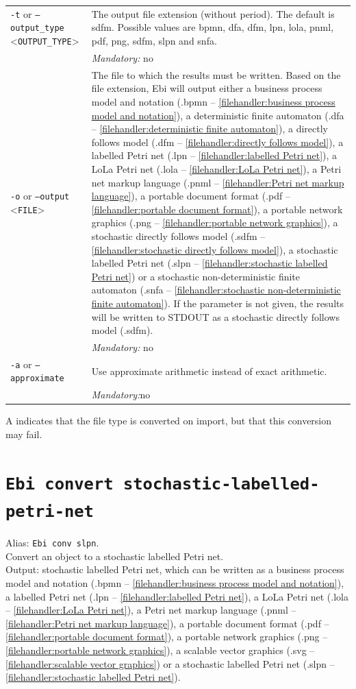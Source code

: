 {\begin{tabularx}{\linewidth}{lX}
\texttt{-t} or \texttt{--output\_type} <\texttt{OUTPUT\_TYPE}> &
The output file extension (without period). The default is sdfm. Possible values are bpmn, dfa, dfm, lpn, lola, pnml, pdf, png, sdfm, slpn and snfa.\\
&\textit{Mandatory:} \quad no\\
\texttt{-o} or \texttt{--output} <\texttt{FILE}> &
The file to which the results must be written. Based on the file extension, Ebi will output either a business process model and notation (.bpmn -- \cref{filehandler:business process model and notation}), a deterministic finite automaton (.dfa -- \cref{filehandler:deterministic finite automaton}), a directly follows model (.dfm -- \cref{filehandler:directly follows model}), a labelled Petri net (.lpn -- \cref{filehandler:labelled Petri net}), a LoLa Petri net (.lola -- \cref{filehandler:LoLa Petri net}), a Petri net markup language (.pnml -- \cref{filehandler:Petri net markup language}), a portable document format (.pdf -- \cref{filehandler:portable document format}), a portable network graphics (.png -- \cref{filehandler:portable network graphics}), a stochastic directly follows model (.sdfm -- \cref{filehandler:stochastic directly follows model}), a stochastic labelled Petri net (.slpn -- \cref{filehandler:stochastic labelled Petri net}) or a stochastic non-deterministic finite automaton (.snfa -- \cref{filehandler:stochastic non-deterministic finite automaton}).
If the parameter is not given, the results will be written to STDOUT as a stochastic directly follows model (.sdfm).\\
&\textit{Mandatory:} \quad no\\
\texttt{-a} or \texttt{--approximate} & Use approximate arithmetic instead of exact arithmetic.\\
&\textit{Mandatory:}\quad no\\
\bottomrule
\end{tabularx}
A \textdagger{} indicates that the file type is converted on import, but that this conversion may fail.
\clearpage\section{\texttt{Ebi convert stochastic-labelled-petri-net}}
\label{command:Ebi convert stochastic-labelled-petri-net}
Alias: \texttt{Ebi conv slpn}.\\
Convert an object to a stochastic labelled Petri net.\\
\noindent Output: stochastic labelled Petri net, which can be written as a business process model and notation (.bpmn -- \cref{filehandler:business process model and notation}), a labelled Petri net (.lpn -- \cref{filehandler:labelled Petri net}), a LoLa Petri net (.lola -- \cref{filehandler:LoLa Petri net}), a Petri net markup language (.pnml -- \cref{filehandler:Petri net markup language}), a portable document format (.pdf -- \cref{filehandler:portable document format}), a portable network graphics (.png -- \cref{filehandler:portable network graphics}), a scalable vector graphics (.svg -- \cref{filehandler:scalable vector graphics}) or a stochastic labelled Petri net (.slpn -- \cref{filehandler:stochastic labelled Petri net}).\\
}

